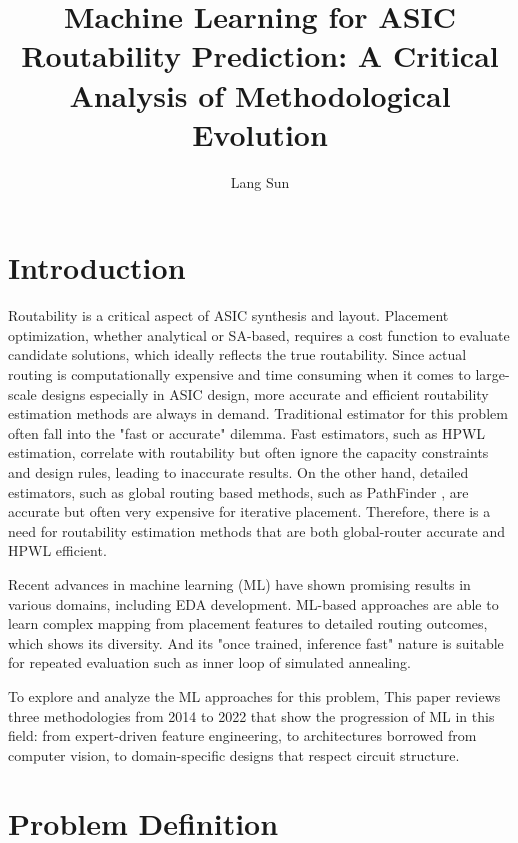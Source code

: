\documentclass[sigconf]{acmart}
\begin{document}
\title{Machine Learning for ASIC Routability Prediction: A Critical Analysis of Methodological Evolution}

\author{Lang Sun}

\maketitle

\section{Introduction}

Routability is a critical aspect of ASIC synthesis and layout. Placement optimization, whether analytical or SA-based, requires a cost function to evaluate candidate solutions, which ideally reflects the true routability. Since actual routing is computationally expensive and time consuming when it comes to large-scale designs especially in ASIC design, more accurate and efficient routability estimation methods are always in demand. Traditional estimator for this problem often fall into the "fast or accurate" dilemma. Fast estimators, such as HPWL estimation, correlate with routability but often ignore the capacity constraints and design rules, leading to inaccurate results. On the other hand, detailed estimators, such as global routing based methods, such as PathFinder \cite{mcmurchie1995pathfinder}, are accurate but often very expensive for iterative placement. Therefore, there is a need for routability estimation methods that are both global-router accurate and HPWL efficient. 

Recent advances in machine learning (ML) have shown promising results in various domains, including EDA development. ML-based approaches are able to learn complex mapping from placement features to detailed routing outcomes, which shows its diversity. And its "once trained, inference fast" nature is suitable for repeated evaluation such as inner loop of simulated annealing.

To explore and analyze the ML approaches for this problem, This paper reviews three methodologies from 2014 to 2022 that show the progression of ML in this field: from expert-driven feature engineering, to architectures borrowed from computer vision, to domain-specific designs that respect circuit structure.

\section{Problem Definition}
\end{document}
